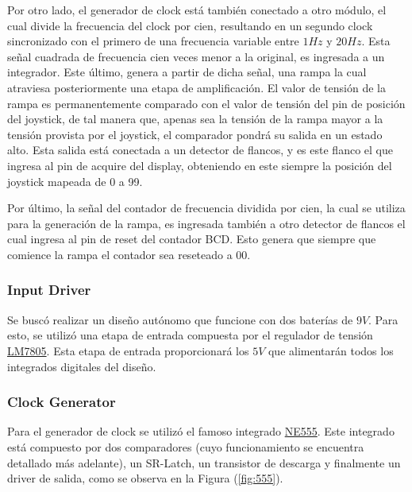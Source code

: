 Por otro lado, el generador de clock está también conectado a otro módulo, el cual divide la frecuencia del clock por cien, resultando en un segundo clock sincronizado con el primero de una frecuencia variable entre $1Hz$ y $20Hz$. Esta señal cuadrada de frecuencia cien veces menor a la original, es ingresada a un integrador. Este último, genera a partir de dicha señal, una rampa la cual atraviesa posteriormente una etapa de amplificación. El valor de tensión de la rampa es permanentemente comparado con el valor de tensión del pin de posición del joystick, de tal manera que, apenas sea la tensión de la rampa mayor a la tensión provista por el joystick, el comparador pondrá su salida en un estado alto. Esta salida está conectada a un detector de flancos, y es este flanco el que ingresa al pin de acquire del display, obteniendo en este siempre la posición del joystick mapeada de 0 a 99.

Por último, la señal del contador de frecuencia dividida por cien, la cual se utiliza para la generación de la rampa, es ingresada también a otro detector de flancos el cual ingresa al pin de reset del contador BCD. Esto genera que siempre que comience la rampa el contador sea reseteado a 00.

\subsubsection{Input Driver}

Se buscó realizar un diseño autónomo que funcione con dos baterías de $9V$. Para esto, se utilizó una etapa de entrada compuesta por el regulador de tensión \href{https://www.sparkfun.com/datasheets/Components/LM7805.pdf}{LM7805}. Esta etapa de entrada proporcionará los $5V$ que alimentarán todos los integrados digitales del diseño.

\subsubsection{Clock Generator}

Para el generador de clock se utilizó el famoso integrado \href{http://www.ti.com/lit/ds/symlink/se555.pdf}{NE555}. Este integrado está compuesto por dos comparadores (cuyo funcionamiento se encuentra detallado más adelante), un SR-Latch, un transistor de descarga y finalmente un driver de salida, como se observa en la Figura (\ref{fig:555}).

